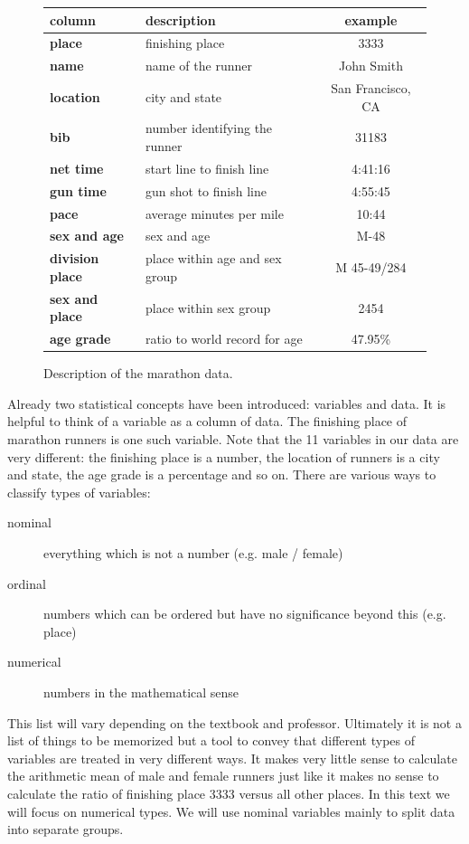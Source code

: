 \documentclass{tufte-book} %
\begin{document}
\begin{figure}
	\centering
	\begin{tabular} { l | l | c }
		\textbf{column} & \textbf{description} & \textbf{example} \\ \hline
		\textbf{place} & finishing place & 3333\\ 
		\textbf{name} & name of the runner & John Smith \\ 
		\textbf{location} & city and state & San Francisco, CA \\ 
		\textbf{bib} & number identifying the runner & 31183 \\ 
		\textbf{net time} & start line to finish line & 4:41:16 \\ 
		\textbf{gun time} & gun shot to finish line & 4:55:45 \\ 
		\textbf{pace} & average minutes per mile & 10:44 \\
		\textbf{sex and age} & sex and age & M-48\\ 
		\textbf{division place} & place within age and sex group & M 45-49/284 \\ 
		\textbf{sex and place} & place within sex group & 2454 \\ 
		\textbf{age grade} & ratio to world record for age & 47.95\% \\
	\end{tabular}
	\label{tab:marathon-data}
	\caption{Description of the marathon data.}
\end{figure}

Already two statistical concepts have been introduced: variables and data. It is helpful to think of a variable as a column of data. The finishing place of marathon runners is one such variable. Note that the 11 variables in our data are very different: the finishing place is a number, the location of runners is a city and state, the age grade is a percentage and so on. There are various ways to classify types of variables:

\begin{description}
	\item[nominal] everything which is not a number (e.g. male / female)
	\item[ordinal] numbers which can be ordered but have no significance beyond this (e.g. place)
	\item[numerical] numbers in the mathematical sense
\end{description}

This list will vary depending on the textbook and professor. Ultimately it is not a list of things to be memorized but a tool to convey that different types of variables are treated in very different ways. It makes very little sense to calculate the arithmetic mean of male and female runners just like it makes no sense to calculate the ratio of finishing place 3333 versus all other places. In this text we will focus on numerical types. We will use nominal variables mainly to split data into separate groups.
\end{document}

